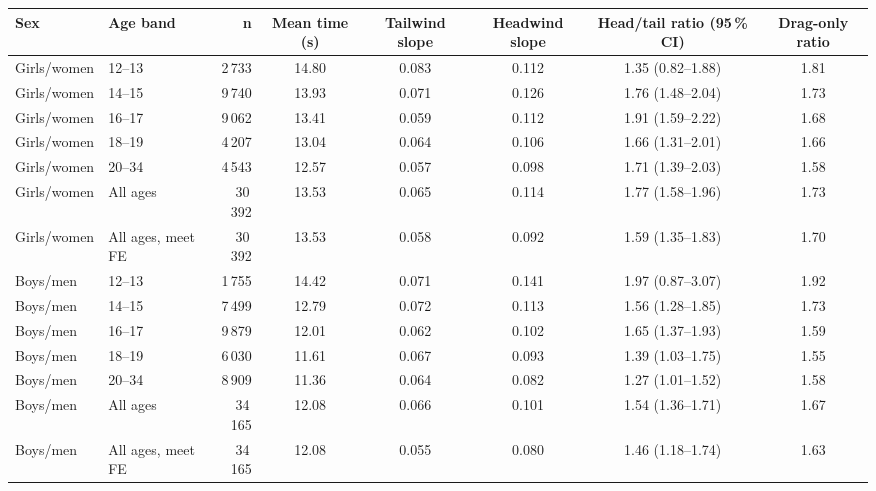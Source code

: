 \begin{tabular}{llrccccc}
\toprule
Sex & Age band & n & Mean time (s) & Tailwind slope & Headwind slope & Head/tail ratio (95\,\% CI) & Drag-only ratio \\
\midrule
Girls/women & 12--13 & 2\,733 & 14.80 & 0.083 & 0.112 & 1.35 (0.82--1.88) & 1.81 \\
Girls/women & 14--15 & 9\,740 & 13.93 & 0.071 & 0.126 & 1.76 (1.48--2.04) & 1.73 \\
Girls/women & 16--17 & 9\,062 & 13.41 & 0.059 & 0.112 & 1.91 (1.59--2.22) & 1.68 \\
Girls/women & 18--19 & 4\,207 & 13.04 & 0.064 & 0.106 & 1.66 (1.31--2.01) & 1.66 \\
Girls/women & 20--34 & 4\,543 & 12.57 & 0.057 & 0.098 & 1.71 (1.39--2.03) & 1.58 \\
Girls/women & All ages & 30\,392 & 13.53 & 0.065 & 0.114 & 1.77 (1.58--1.96) & 1.73 \\
Girls/women & All ages, meet FE & 30\,392 & 13.53 & 0.058 & 0.092 & 1.59 (1.35--1.83) & 1.70 \\
Boys/men & 12--13 & 1\,755 & 14.42 & 0.071 & 0.141 & 1.97 (0.87--3.07) & 1.92 \\
Boys/men & 14--15 & 7\,499 & 12.79 & 0.072 & 0.113 & 1.56 (1.28--1.85) & 1.73 \\
Boys/men & 16--17 & 9\,879 & 12.01 & 0.062 & 0.102 & 1.65 (1.37--1.93) & 1.59 \\
Boys/men & 18--19 & 6\,030 & 11.61 & 0.067 & 0.093 & 1.39 (1.03--1.75) & 1.55 \\
Boys/men & 20--34 & 8\,909 & 11.36 & 0.064 & 0.082 & 1.27 (1.01--1.52) & 1.58 \\
Boys/men & All ages & 34\,165 & 12.08 & 0.066 & 0.101 & 1.54 (1.36--1.71) & 1.67 \\
Boys/men & All ages, meet FE & 34\,165 & 12.08 & 0.055 & 0.080 & 1.46 (1.18--1.74) & 1.63 \\
\bottomrule
\end{tabular}

